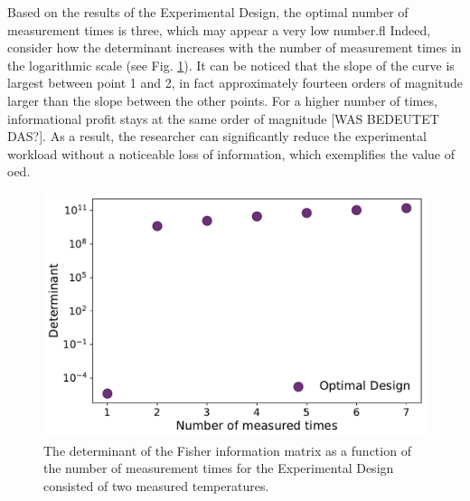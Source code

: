 \documentclass[10pt,A4paper]{article}
\begin{document}
Based on the results of the Experimental Design, the optimal number of measurement times is three, which may appear a very low number.ﬂ Indeed, consider how the determinant increases with the number of measurement times in the logarithmic scale (see Fig. \ref{fig:det_vs_ntimes}). It can be noticed that the slope of the curve is largest between point 1 and 2, in fact approximately fourteen orders of magnitude larger than the slope between the other points. For a higher number of times, informational profit stays at the same order of magnitude [WAS BEDEUTET DAS?]. As a result, the researcher can significantly reduce the experimental workload without a noticeable loss of information, which exemplifies the value of \ac{oed}.
\begin{figure}[H]
    \centering
    \includegraphics[scale=0.4]{Figures/det_vs_ntimes.pdf}
    \caption{{\footnotesize The determinant of the Fisher information matrix as a function of the number of measurement times for the Experimental Design consisted of two measured temperatures.}}
    \label{fig:det_vs_ntimes}
\end{figure}
\end{document}
